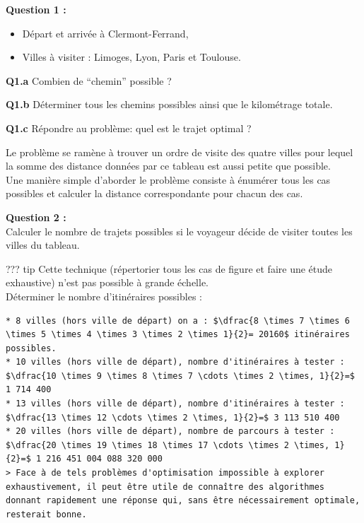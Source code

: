 \textbf{Question 1 :}

\begin{itemize}
\tightlist
\item
  Départ et arrivée à Clermont-Ferrand,\\
\item
  Villes à visiter : Limoges, Lyon, Paris et Toulouse.
\end{itemize}

\textbf{Q1.a} Combien de ``chemin'' possible ?

\textbf{Q1.b} Déterminer tous les chemins possibles ainsi que le
kilométrage totale.

\textbf{Q1.c} Répondre au problème: quel est le trajet optimal ?

Le problème se ramène à trouver un ordre de visite des quatre villes
pour lequel la somme des distance données par ce tableau est aussi
petite que possible.\\
Une manière simple d'aborder le problème consiste à énumérer tous les
cas possibles et calculer la distance correspondante pour chacun des
cas.

\textbf{Question 2 :}\\
Calculer le nombre de trajets possibles si le voyageur décide de visiter
toutes les villes du tableau.

??? tip Cette technique (répertorier tous les cas de figure et faire une
étude exhaustive) n'est pas possible à grande échelle.\\
Déterminer le nombre d'itinéraires possibles :

\begin{verbatim}
* 8 villes (hors ville de départ) on a : $\dfrac{8 \times 7 \times 6 \times 5 \times 4 \times 3 \times 2 \times 1}{2}= 20160$ itinéraires possibles.  
* 10 villes (hors ville de départ), nombre d'itinéraires à tester : $\dfrac{10 \times 9 \times 8 \times 7 \cdots \times 2 \times, 1}{2}=$ 1 714 400  
* 13 villes (hors ville de départ), nombre d'itinéraires à tester : $\dfrac{13 \times 12 \cdots \times 2 \times, 1}{2}=$ 3 113 510 400  
* 20 villes (hors ville de départ), nombre de parcours à tester :  $\dfrac{20 \times 19 \times 18 \times 17 \cdots \times 2 \times, 1}{2}=$ 1 216 451 004 088 320 000   
> Face à de tels problèmes d'optimisation impossible à explorer exhaustivement, il peut être utile de connaître des algorithmes donnant rapidement une réponse qui, sans être nécessairement optimale, resterait bonne.
\end{verbatim}

